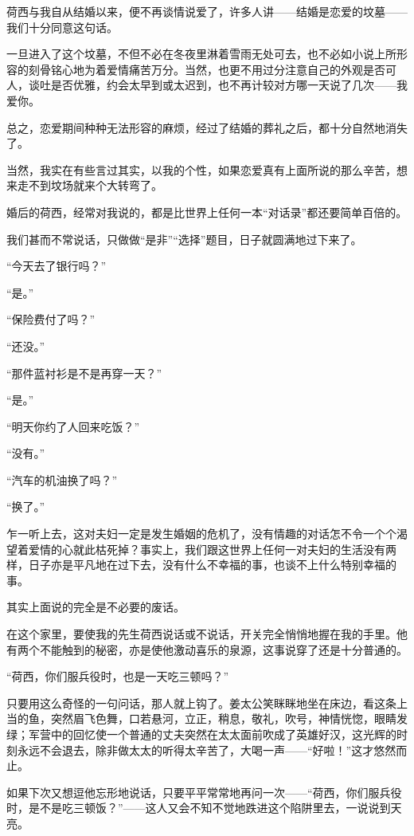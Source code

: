 \par 荷西与我自从结婚以来，便不再谈情说爱了，许多人讲——结婚是恋爱的坟墓——我们十分同意这句话。
\par 一旦进入了这个坟墓，不但不必在冬夜里淋着雪雨无处可去，也不必如小说上所形容的刻骨铭心地为着爱情痛苦万分。当然，也更不用过分注意自己的外观是否可人，谈吐是否优雅，约会太早到或太迟到，也不再计较对方哪一天说了几次——我爱你。
\par 总之，恋爱期间种种无法形容的麻烦，经过了结婚的葬礼之后，都十分自然地消失了。
\par 当然，我实在有些言过其实，以我的个性，如果恋爱真有上面所说的那么辛苦，想来走不到坟场就来个大转弯了。
\par 婚后的荷西，经常对我说的，都是比世界上任何一本“对话录”都还要简单百倍的。
\par 我们甚而不常说话，只做做“是非”“选择”题目，日子就圆满地过下来了。
\par “今天去了银行吗？”
\par “是。”
\par “保险费付了吗？”
\par “还没。”
\par “那件蓝衬衫是不是再穿一天？”
\par “是。”
\par “明天你约了人回来吃饭？”
\par “没有。”
\par “汽车的机油换了吗？”
\par “换了。”
\par 乍一听上去，这对夫妇一定是发生婚姻的危机了，没有情趣的对话怎不令一个个渴望着爱情的心就此枯死掉？事实上，我们跟这世界上任何一对夫妇的生活没有两样，日子亦是平凡地在过下去，没有什么不幸福的事，也谈不上什么特别幸福的事。
\par 其实上面说的完全是不必要的废话。
\par 在这个家里，要使我的先生荷西说话或不说话，开关完全悄悄地握在我的手里。他有两个不能触到的秘密，亦是使他激动喜乐的泉源，这事说穿了还是十分普通的。
\par “荷西，你们服兵役时，也是一天吃三顿吗？”
\par 只要用这么奇怪的一句问话，那人就上钩了。姜太公笑眯眯地坐在床边，看这条上当的鱼，突然眉飞色舞，口若悬河，立正，稍息，敬礼，吹号，神情恍惚，眼睛发绿；军营中的回忆使一个普通的丈夫突然在太太面前吹成了英雄好汉，这光辉的时刻永远不会退去，除非做太太的听得太辛苦了，大喝一声——“好啦！”这才悠然而止。
\par 如果下次又想逗他忘形地说话，只要平平常常地再问一次——“荷西，你们服兵役时，是不是吃三顿饭？”——这人又会不知不觉地跌进这个陷阱里去，一说说到天亮。
